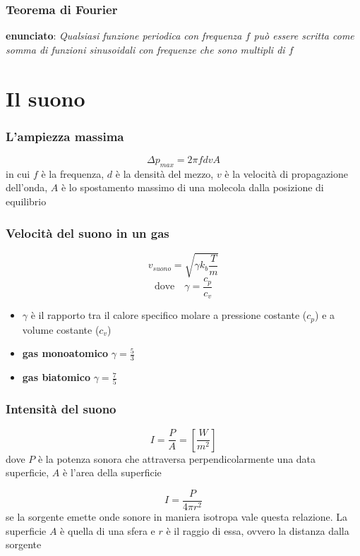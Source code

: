 \documentclass{article}
\begin{document}
\subsubsection*{Teorema di Fourier}
\textbf{enunciato}: \textit{Qualsiasi funzione periodica con frequenza $f$ può essere scritta come somma di funzioni sinusoidali con frequenze che sono multipli di $f$}

\section*{Il suono}
\subsubsection*{L'ampiezza massima}
$$ \Delta p_{max} = 2\pi fdvA $$
in cui $f$ è la frequenza, $d$ è la densità del mezzo, $v$ è la velocità di propagazione dell'onda, $A$ è lo spostamento massimo di una molecola dalla posizione di equilibrio

\subsubsection*{Velocità del suono in un gas}
$$ v_{suono} = \sqrt{\gamma k_b \frac{T}{m}} $$
$$ \text{dove} \hspace{1em} \gamma = \frac{c_p}{c_v} $$
\begin{itemize}
    \item $\gamma$ è il rapporto tra il calore specifico molare a pressione costante ($c_p$) e a volume costante ($c_v$)
    \item \textbf{gas monoatomico} \textrightarrow \hspace{1em} $\gamma = \frac{5}{3}$
    \item \textbf{gas biatomico} \textrightarrow \hspace{1em} $\gamma = \frac{7}{5}$
\end{itemize}

\subsubsection*{Intensità del suono}
$$ I = \frac{P}{A} = \left[\frac{W}{m^2}\right] $$
dove $P$ è la potenza sonora che attraversa perpendicolarmente una data superficie, $A$ è l'area della superficie

\vspace{1em}

$$ I = \frac{P}{4\pi r^2} $$
se la sorgente emette onde sonore in maniera isotropa vale questa relazione. La superficie $A$ è quella di una sfera e $r$ è il raggio di essa, ovvero la distanza dalla sorgente
\end{document}

